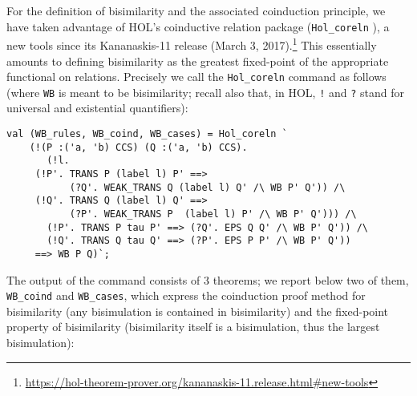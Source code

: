 For the definition of bisimilarity and the associated coinduction
principle, 
we have  taken
advantage of HOL's coinductive relation package (\texttt{Hol_coreln} \cite{Anonymous:Iu-sOoz1}),
a new tools since its Kananaskis-11 release (March 3,
2017).\footnote{\url{https://hol-theorem-prover.org/kananaskis-11.release.html\#new-tools}}
This essentially amounts to defining bisimilarity as the greatest
fixed-point of the appropriate functional on relations. 
Precisely we call 
the \texttt{Hol_coreln}
command as follows (where  \texttt{WB} is meant to be bisimilarity;
recall also that, in HOL, {\tt !} and  {\tt ?}  stand for universal and
existential quantifiers):
\begin{lstlisting}
val (WB_rules, WB_coind, WB_cases) = Hol_coreln `
    (!(P :('a, 'b) CCS) (Q :('a, 'b) CCS).
       (!l.
	 (!P'. TRANS P (label l) P' ==>
	       (?Q'. WEAK_TRANS Q (label l) Q' /\ WB P' Q')) /\
	 (!Q'. TRANS Q (label l) Q' ==>
	       (?P'. WEAK_TRANS P  (label l) P' /\ WB P' Q'))) /\
       (!P'. TRANS P tau P' ==> (?Q'. EPS Q Q' /\ WB P' Q')) /\
       (!Q'. TRANS Q tau Q' ==> (?P'. EPS P P' /\ WB P' Q'))
     ==> WB P Q)`;
\end{lstlisting}
The output of the command  consists of 
 3 theorems; we report below  two of them, 
\texttt{WB_coind} and \texttt{WB_cases},
which 
express the coinduction proof method for bisimilarity 
(any bisimulation is contained in bisimilarity)
and the fixed-point property of bisimilarity
(bisimilarity itself is a bisimulation, thus the largest bisimulation): 
